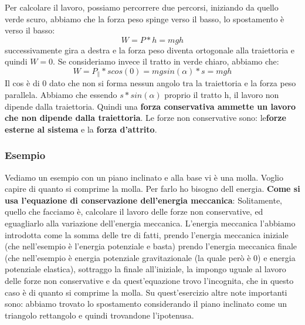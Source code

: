 \documentclass{article}
\numberwithin{equation}{subsection}
\begin{document}
\noindent
Per calcolare il lavoro, possiamo percorrere due percorsi, iniziando da quello verde scuro, abbiamo che la forza peso spinge verso il basso, lo spostamento è verso il basso:
\begin{equation}
    W=P * h=mgh
\end{equation}
successivamente gira a destra e la forza peso diventa ortogonale alla traiettoria e quindi $W=0$. Se consideriamo invece il tratto in verde chiaro, abbiamo che:
\begin{equation}
    W=P_\parallel*scos(0) = mgsin(\alpha)*s=mgh
\end{equation}
Il cos è di 0 dato che non si forma nessun angolo tra la traiettoria e la forza peso parallela. Abbiamo che essendo $s*sin(\alpha)$ proprio il tratto h, il lavoro non dipende dalla traiettoria. Quindi una \textbf{forza conservativa ammette un lavoro che non dipende dalla traiettoria}. Le forze non conservative sono: le\textbf{forze esterne al sistema} e la \textbf{forza d'attrito}.
\subsubsection{Esempio}
Vediamo un esempio con un piano inclinato e alla base vi è una molla. Voglio capire di quanto si comprime la molla. Per farlo ho bisogno dell energia. \textbf{Come si usa l'equazione di conservazione dell'energia meccanica}: Solitamente, quello che facciamo è, calcolare il lavoro delle forze non conservative, ed eguagliarlo alla variazione dell'energia meccanica. L'energia meccanica l'abbiamo introdotta come la somma delle tre di fatti, prendo l'energia meccanica iniziale (che nell'esempio è l'energia potenziale e basta) prendo l'energia meccanica finale (che nell'esempio è energia potenziale gravitazionale (la quale però è 0) e energia potenziale elastica), sottraggo la finale all'iniziale, la impongo uguale al lavoro delle forze non conservative e da quest'equazione trovo l'incognita, che in questo caso è di quanto si comprime la molla. Su quest'esercizio altre note importanti sono: abbiamo trovato lo spostamento considerando il piano inclinato come un triangolo rettangolo e quindi trovandone l'ipotenusa.
\end{document}
